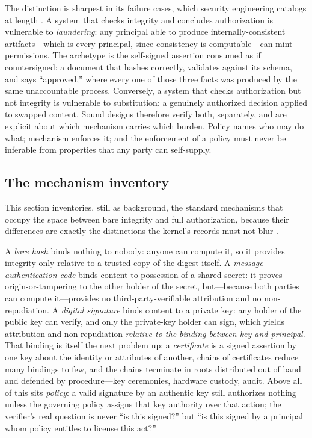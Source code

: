 The distinction is sharpest in its failure cases, which security
engineering catalogs at length \cite{anderson}. A system that
checks integrity and concludes authorization is vulnerable to
\emph{laundering}: any principal able to produce
internally-consistent artifacts---which is every principal, since
consistency is computable---can mint permissions. The archetype is
the self-signed assertion consumed as if countersigned: a document
that hashes correctly, validates against its schema, and says
``approved,'' where every one of those three facts was produced by
the same unaccountable process. Conversely, a system that checks
authorization but not integrity is vulnerable to substitution: a
genuinely authorized decision applied to swapped content. Sound
designs therefore verify both, separately, and are explicit about
which mechanism carries which burden. Policy names who may do what;
mechanism enforces it; and the enforcement of a policy must never be
inferable from properties that any party can self-supply.

\subsection{The mechanism inventory}\label{ch02:auth-mechanisms}

This section inventories, still as background, the standard
mechanisms that occupy the space between bare integrity and full
authorization, because their differences are exactly the
distinctions the kernel's records must not blur \cite{anderson}.

A \emph{bare hash} binds nothing to nobody: anyone can compute it,
so it provides integrity only relative to a trusted copy of the
digest itself. A \emph{message authentication code} binds content to
possession of a shared secret: it proves origin-or-tampering to the
other holder of the secret, but---because both parties can compute
it---provides no third-party-verifiable attribution and no
non-repudiation. A \emph{digital signature} binds content to a
private key: any holder of the public key can verify, and only the
private-key holder can sign, which yields attribution and
non-repudiation \emph{relative to the binding between key and
principal}. That binding is itself the next problem up: a
\emph{certificate} is a signed assertion by one key about the
identity or attributes of another, chains of certificates reduce
many bindings to few, and the chains terminate in roots distributed
out of band and defended by procedure---key ceremonies, hardware
custody, audit. Above all of this sits \emph{policy}: a valid
signature by an authentic key still authorizes nothing unless the
governing policy assigns that key authority over that action; the
verifier's real question is never ``is this signed?'' but ``is this
signed by a principal whom policy entitles to license this act?''

